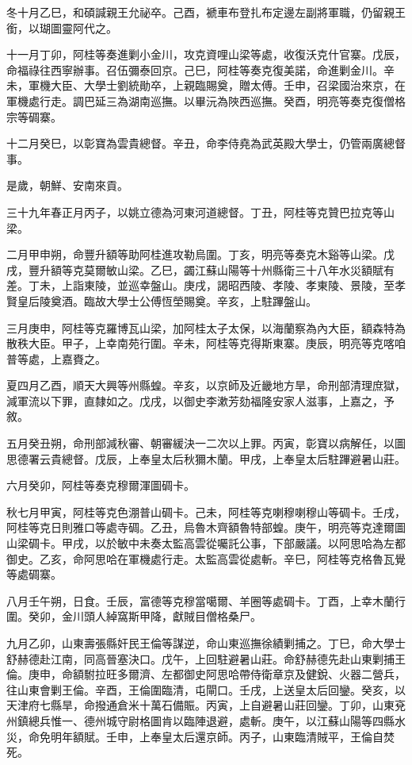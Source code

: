 \begin{pinyinscope}
冬十月乙巳，和碩諴親王允祕卒。己酉，褫車布登扎布定邊左副將軍職，仍留親王銜，以瑚圖靈阿代之。

十一月丁卯，阿桂等奏進剿小金川，攻克資哩山梁等處，收復沃克什官寨。戊辰，命福祿往西寧辦事。召伍彌泰回京。己巳，阿桂等奏克復美諾，命進剿金川。辛未，軍機大臣、大學士劉統勛卒，上親臨賜奠，贈太傅。壬申，召梁國治來京，在軍機處行走。調巴延三為湖南巡撫。以畢沅為陜西巡撫。癸酉，明亮等奏克復僧格宗等碉寨。

十二月癸巳，以彰寶為雲貴總督。辛丑，命李侍堯為武英殿大學士，仍管兩廣總督事。

是歲，朝鮮、安南來貢。

三十九年春正月丙子，以姚立德為河東河道總督。丁丑，阿桂等克贊巴拉克等山梁。

二月甲申朔，命豐升額等助阿桂進攻勒烏圍。丁亥，明亮等奏克木谿等山梁。戊戌，豐升額等克莫爾敏山梁。乙巳，蠲江蘇山陽等十州縣衛三十八年水災額賦有差。丁未，上詣東陵，並巡幸盤山。庚戌，謁昭西陵、孝陵、孝東陵、景陵，至孝賢皇后陵奠酒。臨故大學士公傅恆塋賜奠。辛亥，上駐蹕盤山。

三月庚申，阿桂等克羅博瓦山梁，加阿桂太子太保，以海蘭察為內大臣，額森特為散秩大臣。甲子，上幸南苑行圍。辛未，阿桂等克得斯東寨。庚辰，明亮等克喀咱普等處，上嘉賚之。

夏四月乙酉，順天大興等州縣蝗。辛亥，以京師及近畿地方旱，命刑部清理庶獄，減軍流以下罪，直隸如之。戊戌，以御史李漱芳劾福隆安家人滋事，上嘉之，予敘。

五月癸丑朔，命刑部減秋審、朝審緩決一二次以上罪。丙寅，彰寶以病解任，以圖思德署云貴總督。戊辰，上奉皇太后秋獮木蘭。甲戌，上奉皇太后駐蹕避暑山莊。

六月癸卯，阿桂等奏克穆爾渾圖碉卡。

秋七月甲寅，阿桂等克色淜普山碉卡。己未，阿桂等克喇穆喇穆山等碉卡。壬戌，阿桂等克日則雅口等處寺碉。乙丑，烏魯木齊額魯特部蝗。庚午，明亮等克達爾圖山梁碉卡。甲戌，以於敏中未奏太監高雲從囑託公事，下部嚴議。以阿思哈為左都御史。乙亥，命阿思哈在軍機處行走。太監高雲從處斬。辛巳，阿桂等克格魯瓦覺等處碉寨。

八月壬午朔，日食。壬辰，富德等克穆當噶爾、羊圈等處碉卡。丁酉，上幸木蘭行圍。癸卯，金川頭人綽窩斯甲降，獻賊目僧格桑尸。

九月乙卯，山東壽張縣奸民王倫等謀逆，命山東巡撫徐績剿捕之。丁巳，命大學士舒赫德赴江南，同高晉塞決口。戊午，上回駐避暑山莊。命舒赫德先赴山東剿捕王倫。庚申，命額駙拉旺多爾濟、左都御史阿思哈帶侍衛章京及健銳、火器二營兵，往山東會剿王倫。辛酉，王倫圍臨清，屯閘口。壬戌，上送皇太后回鑾。癸亥，以天津府七縣旱，命撥通倉米十萬石備賑。丙寅，上自避暑山莊回鑾。丁卯，山東兗州鎮總兵惟一、德州城守尉格圖肯以臨陣退避，處斬。庚午，以江蘇山陽等四縣水災，命免明年額賦。壬申，上奉皇太后還京師。丙子，山東臨清賊平，王倫自焚死。


\end{pinyinscope}
